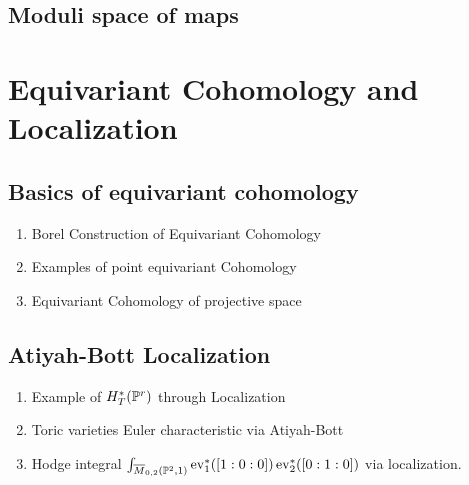 \documentclass[12pt]{memoir}
\begin{document}
\section{Moduli space of maps}

\chapter{Equivariant Cohomology and Localization}

\section{Basics of equivariant cohomology}
\begin{enumerate}
    \item Borel Construction of Equivariant Cohomology
    \item Examples of point equivariant Cohomology
    \item Equivariant Cohomology of projective space
\end{enumerate}

\section{Atiyah-Bott Localization}

\begin{enumerate}
    \item Example of $H^\ast_T(\mathbb{P}^r)$ through Localization
    \item Toric varieties Euler characteristic via Atiyah-Bott
    \item Hodge integral $\int_{\overline M_{0,2}(\mathbb{P}^2,1)}\operatorname{ev}_1^\ast([1:0:0])\operatorname{ev}_2^\ast([0:1:0])$ via localization.
\end{enumerate}
\end{document}
